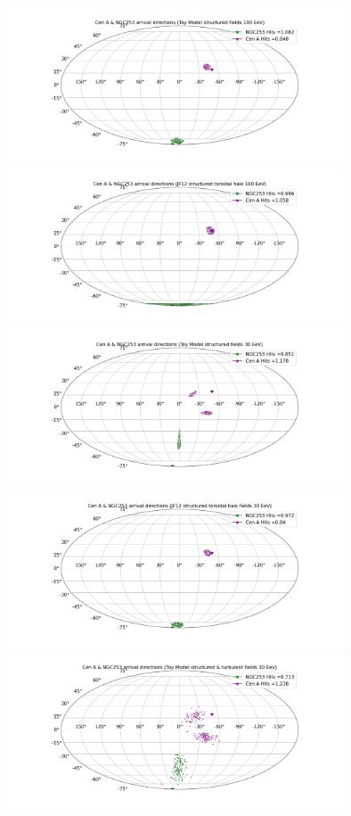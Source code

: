 \documentclass[12pt, a4 paper]{article}
\begin{document}
\begin{figure}[h!]
    \centering
    \includegraphics[width = 10cm]{Images/CenA_NGC253_Str_TM_100EeV.png}%
    \includegraphics[width = 10cm]{Images/CenA_NGC253_Str_JF12_100EeV.png}
    \includegraphics[width = 10cm]{Images/CenA_NGC253_Str_TM_30EeV.png}%
    \includegraphics[width = 10cm]{Images/CenA_NGC253_Str_JF12_30EeV.png}
    \includegraphics[width =10cm]{Images/CenA_NGC253_Str_Tur_TM_30EeV.png}%

\end{figure}
\end{document}
